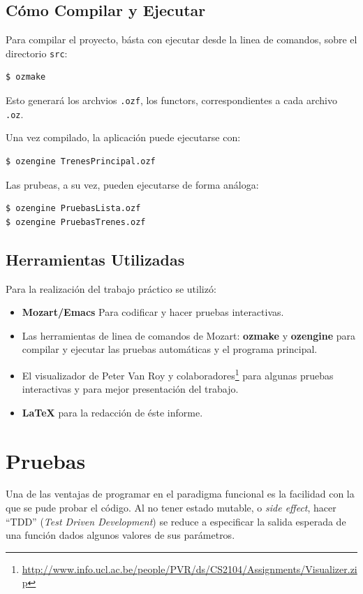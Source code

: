 \documentclass[12pt,titlepage]{article}
\begin{document}
\subsection{Cómo Compilar y Ejecutar}

Para compilar el proyecto, básta con ejecutar desde la linea de comandos, sobre el directorio \verb|src|:
\begin{lstlisting}
$ ozmake
\end{lstlisting}

Esto generará los archvios \verb|.ozf|, los functors, correspondientes a cada archivo \verb|.oz|.

Una vez compilado, la aplicación puede ejecutarse con:
\begin{lstlisting}
$ ozengine TrenesPrincipal.ozf
\end{lstlisting}

Las prubeas, a su vez, pueden ejecutarse de forma análoga:
\begin{lstlisting}
$ ozengine PruebasLista.ozf
$ ozengine PruebasTrenes.ozf
\end{lstlisting}

\subsection{Herramientas Utilizadas}

Para la realización del trabajo práctico se utilizó:
\begin{itemize}
  \item {\bf Mozart/Emacs} Para codificar y hacer pruebas interactivas.
  \item Las herramientas de linea de comandos de Mozart: {\bf ozmake} y {\bf ozengine} para compilar y ejecutar las pruebas automáticas y el programa principal.
  \item El visualizador de Peter Van Roy y colaboradores\footnote{\url{http://www.info.ucl.ac.be/people/PVR/ds/CS2104/Assignments/Visualizer.zip}} para algunas pruebas interactivas y para mejor presentación del trabajo.
  \item {\bf \LaTeX} para la redacción de éste informe.
\end{itemize}

\section{Pruebas}

Una de las ventajas de programar en el paradigma funcional es la facilidad con la que se pude probar el código. Al no tener estado mutable, o {\it side effect}, hacer ``TDD'' ({\it Test Driven Development}) se reduce a especificar la salida esperada de una función dados algunos valores de sus parámetros.
\end{document}
